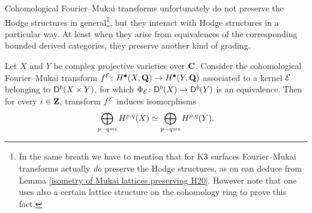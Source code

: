 





Cohomological Fourier--Mukai transforms unfortunately do not preserve the Hodge structures in general\footnote{
    In the same breath we have to mention that for K3 surfaces Fourier--Mukai transforms actually \emph{do} preserve the Hodge structures, as on can deduce from Lemma \ref{isometry of Mukai lattices preserving H20}. However note that one uses also a certain lattice structure on the cohomology ring to prove this fact.
}, but they interact with Hodge structures in a particular way. At least when they arise from equivalences of the corresponding bounded derived categories, they preserve another kind of grading.

\begin{proposition}
    \label{Hodge lattice, fm transform interaction}
    Let $X$ and $Y$ be complex projective varieties over $\mathbf C$. Consider the cohomological Fourier--Mukai transform $f^{\mathcal E} \colon H^{\bullet}(X, \mathbf Q) \to H^{\bullet}(Y, \mathbf Q)$ associated to a kernel $\mathcal E$ belonging to $\mathsf{D}^b(X \times Y)$, for which $\Phi_{\mathcal E} \colon \mathsf{D}^b(X) \to \mathsf{D}^b(Y)$ is an equivalence.
    Then for every $i \in \mathbf Z$, transform $f^{\mathcal E}$ induces isomorphisms
    \begin{equation*}
        \bigoplus_{p-q = i}H^{p,q}(X) \simeq \bigoplus_{p - q = i} H^{p,q}(Y).
    \end{equation*}
\end{proposition}

